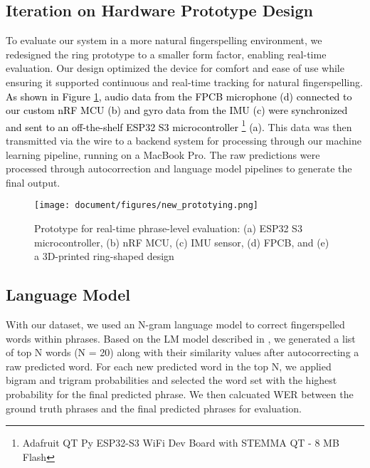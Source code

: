 \subsection{Iteration on Hardware Prototype Design}
To evaluate our system in a more natural fingerspelling environment, we redesigned the ring prototype to a smaller form factor, enabling real-time evaluation. Our design optimized the device for comfort and ease of use while ensuring it supported continuous and real-time tracking for natural fingerspelling. \textcolor{black}{As shown in Figure \ref{fig:prototype2}, audio data from the FPCB microphone \textcolor{black}{(d)} connected to our custom nRF MCU \textcolor{black}{(b)} and gyro data from the IMU \textcolor{black}{(c)} were synchronized and sent to an off-the-shelf ESP32 S3 microcontroller \footnote{Adafruit QT Py ESP32-S3 WiFi Dev Board with STEMMA QT - 8 MB Flash} \textcolor{black}{(a)}.} This data was then transmitted via the wire to a backend system for processing through our machine learning pipeline, running on a MacBook Pro. The raw predictions were processed through autocorrection and language model pipelines to generate the final output.
\begin{figure}[t]
  \texttt{[image: document/figures/new\_prototying.png]}
  \caption{Prototype for real-time phrase-level evaluation: (a) ESP32 S3 microcontroller, (b) nRF MCU, (c) IMU sensor, (d) FPCB, and (e) a 3D-printed ring-shaped design}
  \label{fig:prototype2}
\end{figure}


\subsection{Language Model}
With our dataset, we used an N-gram language model to correct fingerspelled words within phrases. Based on the LM model described in \cite{zhu2018typing}, we generated a list of top N words (N = 20) along with their similarity values after autocorrecting a raw predicted word. For each new predicted word in the top N, we applied bigram and trigram probabilities and selected the word set with the highest probability for the final predicted phrase. We then calcuated WER between the ground truth phrases and the final predicted phrases for evaluation. 










